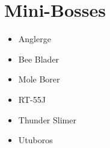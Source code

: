 \section{Mini-Bosses}
	\begin{itemize}
		\item \hypertarget{miniboss:Anglerge}{Anglerge}
		\item \hypertarget{miniboss:Bee_Blader}{Bee Blader}
		\item \hypertarget{miniboss:Mole_Borer}{Mole Borer}
		\item \hypertarget{miniboss:RT-55J}{RT-55J}
		\item \hypertarget{miniboss:Thunder_Slimer}{Thunder Slimer}
		\item \hypertarget{miniboss:Utuboros}{Utuboros}
	\end{itemize}

